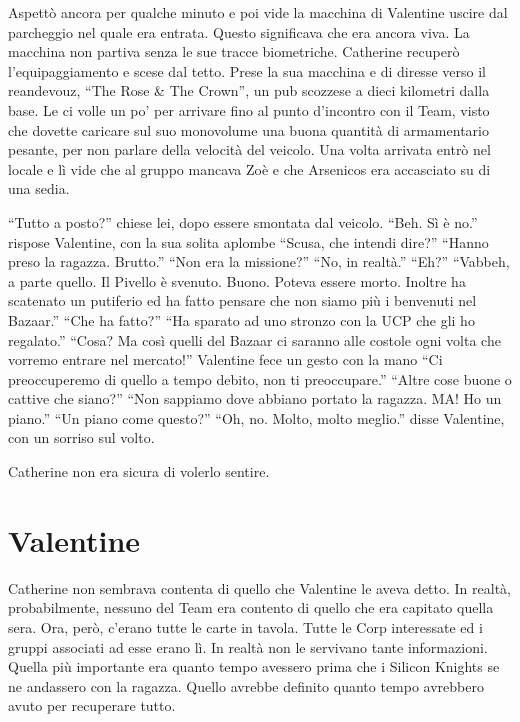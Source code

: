     Aspettò ancora per qualche minuto e poi vide la macchina di Valentine uscire dal parcheggio nel quale era entrata.
    Questo significava che era ancora viva. La macchina non partiva senza le sue tracce biometriche. Catherine recuperò
    l'equipaggiamento e scese dal tetto. Prese la sua macchina e di diresse verso il reandevouz, ``The Rose \& The
    Crown'', un pub scozzese a dieci kilometri dalla base. Le ci volle un po' per
    arrivare fino al punto d'incontro con il Team, visto che dovette caricare sul suo monovolume una buona quantità di
    armamentario pesante, per non parlare della velocità del veicolo. Una volta arrivata entrò nel locale e lì vide che
    al gruppo mancava Zoè e che Arsenicos era accasciato su di una sedia.

    ``Tutto a posto?'' chiese lei, dopo essere smontata dal veicolo. ``Beh. Sì è no.'' rispose Valentine, con la sua
    solita aplombe ``Scusa, che intendi dire?'' ``Hanno preso la ragazza. Brutto.'' ``Non era la missione?'' ``No, in
    realtà.'' ``Eh?'' ``Vabbeh, a parte quello. Il Pivello è svenuto. Buono. Poteva essere morto. Inoltre ha scatenato
    un putiferio ed ha fatto pensare che non siamo più i benvenuti nel Bazaar.'' ``Che ha fatto?'' ``Ha sparato ad uno
    stronzo con la UCP che gli ho regalato.'' ``Cosa? Ma così quelli del Bazaar ci saranno alle costole ogni volta che
    vorremo entrare nel mercato!'' Valentine fece un gesto con la mano ``Ci preoccuperemo di quello a tempo debito, non
    ti preoccupare.'' ``Altre cose buone o cattive che siano?'' ``Non sappiamo dove abbiano portato la ragazza. MA! Ho
    un piano.'' ``Un piano come questo?'' ``Oh, no. Molto, molto meglio.'' disse Valentine, con un sorriso sul volto.

    Catherine non era sicura di volerlo sentire.

  \section*{Valentine}

    Catherine non sembrava contenta di quello che Valentine le aveva detto. In realtà, probabilmente, nessuno del Team
    era contento di quello che era capitato quella sera. Ora, però, c'erano tutte le carte in tavola. Tutte le Corp
    interessate ed i gruppi associati ad esse erano lì. In realtà non le servivano tante informazioni. Quella più
    importante era quanto tempo avessero prima che i Silicon Knights se ne andassero con la ragazza. Quello avrebbe
    definito quanto tempo avrebbero avuto per recuperare tutto.

